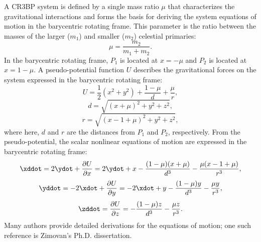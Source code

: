 A CR3BP system is defined by a single mass ratio $\mu$ that characterizes the gravitational
interactions and forms the basis for deriving the system equations of motion in the barycentric
rotating frame. This parameter is the ratio between the masses of the larger ($m_{1}$) and smaller
($m_{2}$) celestial primaries:
\begin{equation}
    \mu=\frac{m_{2}}{m_{1}+m_{2}}.
    \label{eq:mu}
\end{equation}
In the barycentric rotating frame, $P_{1}$ is located at $x=-\mu$ and $P_{2}$ is
located at $x=1-\mu$. A pseudo-potential function $U$ describes the gravitational forces on the
system expressed in the barycentric rotating frame:
\begin{equation}
    U=\frac{1}{2}(x^{2}+y^{2})+\frac{1-\mu}{d}+\frac{\mu}{r},
    \label{eq:pseudopotential}
\end{equation}
\vspace{1mm}
\begin{equation}
    d=\sqrt{(x+\mu)^{2}+y^{2}+z^{2}},
    \label{eq:P1distance}
\end{equation}
\vspace{1mm}
\begin{equation}
    r=\sqrt{(x-1+\mu)^{2}+y^{2}+z^{2}},
    \label{eq:P2distance}
\end{equation}
where here, $d$ and $r$ are the distances from $P_{1}$ and $P_{2}$, respectively. From the
pseudo-potential, the scalar nonlinear equations of motion are expressed in the barycentric
rotating frame:
\begin{equation}
    \xddot=2\ydot+\frac{\partial U}{\partial x}=2\ydot+x-\frac{(1-\mu)(x+\mu)}{d^{3}}-\frac{\mu(x-1+\mu)}{r^{3}},
    \label{eq:EoMx}
\end{equation}
\vspace{1mm}
\begin{equation}
    \yddot=-2\xdot+\frac{\partial U}{\partial y}=-2\xdot+y-\frac{(1-\mu)y}{d^{3}}-\frac{\mu y}{r^{3}},
    \label{eq:EoMy}
\end{equation}
\vspace{1mm}
\begin{equation}
    \zddot=\frac{\partial U}{\partial z}=-\frac{(1-\mu)z}{d^{3}}-\frac{\mu z}{r^{3}}.
    \label{eq:EoMz}
\end{equation}
Many authors provide detailed derivations for the equations of motion; one such reference is
Zimovan's Ph.D. dissertation\cite{Zimovan:2017}.

